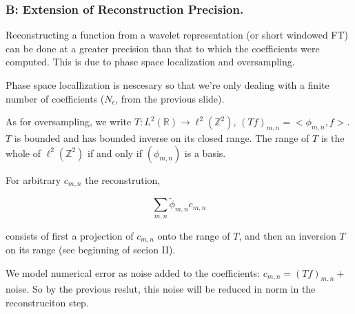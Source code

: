 \documentclass{beamer}
\newcommand{\ints}[0] { \mathbb{Z}}
\newcommand{\reals}[0] { \mathbb{R}}
\newcommand{\eps}[0] {  \epsilon }
\begin{document}
\begin{frame}
\frametitle{B: Extension of Reconstruction Precision.}

\begin{flushleft}
Reconstructing a function from a wavelet representation (or short windowed FT) can be done at a greater precision than that to which the coefficients were computed. This is due to phase space localization and oversampling.
\end{flushleft}

\begin{flushleft}
Phase space locallization is nescesary so that we're only dealing with a finite number of coefficients ($N_\eps$, from the previous slide).
\end{flushleft}

\begin{flushleft}
As for oversampling, we write $T:L^2(\reals) \rightarrow \ell^2(\ints^2)$, $(T f)_{m,n} = <\phi_{m,n}, f>$. $T$ is bounded and has bounded inverse on its closed range. The range of $T$ is the whole of $\ell^2(\ints^2)$ if and only if $(\phi_{m,n})$ is a basis. 
\end{flushleft}

\end{frame}



\begin{frame}

For arbitrary $c_{m,n}$ the reconstrution, 

\begin{equation*}
\sum_{m,n} \tilde \phi_{m,n} c_{m,n}
\end{equation*}

\begin{flushleft}
consists of first a projection of $c_{m,n}$  onto the range of $T$, and then an inversion $T$ on its range (see beginning of secion II). \\
\end{flushleft}

\begin{flushleft}
We model numerical error as noise added to the coefficients: $c_{m,n} = (Tf)_{m,n} + $ noise. So by the previous reslut, this noise will be reduced in norm in the reconstruciton step.
\end{flushleft}

\end{frame}
    
\end{document}
